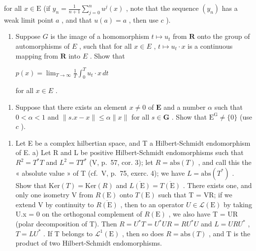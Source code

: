 for all \(x \in \mathrm{E}\) (if \(y_{n} = \frac{1}{n + 1} \sum_{j=0}^{n} u^{j}(x)\) , note that the sequence \((y_{n})\) has a weak limit point \(a\) , and that \(u(a) = a\) , then use \(c\) ).

\begin{enumerate}
\def\labelenumi{\alph{enumi})}
\setcounter{enumi}{4}
\tightlist
\item
  Suppose \(G\) is the image of a homomorphism \(t \mapsto u_t\) from \(\mathbf{R}\) onto the group of automorphisms of \(E\) , such that for all \(x \in E\) , \(t \mapsto u_t \cdot x\) is a continuous mapping from \(\mathbf{R}\) into \(E\) . Show that

\(p(x) = \lim_{T \to \infty} \frac{1}{T} \int_{0}^{T} u_t \cdot x \, dt\)

for all \(x \in E\) .

\end{enumerate}

\begin{enumerate}
\def\labelenumi{\alph{enumi})}
\setcounter{enumi}{5}
\tightlist
\item
  Suppose that there exists an element \(x \neq 0\) of \(\mathbf{E}\) and a number \(\alpha\) such that \(0 < \alpha < 1\) and \(\| s.x - x\| \leqslant \alpha \| x\|\) for all \(s \in \mathbf{G}\) . Show that \(\mathrm{E}^{\mathrm{G}} \neq \{0\}\) (use \(c\) ).
\end{enumerate}

\begin{enumerate}
\def\labelenumi{\arabic{enumi})}
\setcounter{enumi}{13}
\tightlist
\item
  Let E be a complex hilbertian space, and T a Hilbert-Schmidt endomorphism of E. a) Let R and L be positive Hilbert-Schmidt endomorphisms such that \(R^{2} = T^{*}T\) and \(L^{2} = TT^{*}\) (V, p.~57, cor. 3); let \(R = \text{abs}(T)\) , and call this the « absolute value » of T (cf.~V, p.~75, exerc. 4); we have \(L = \text{abs}(T^{*})\) . Show that \(\text{Ker}(T) = \text{Ker}(R)\) and \(\overline{L(\text{E})} = \overline{T(\text{E})}\) . There exists one, and only one isometry V from \(R(\text{E})\) onto \(T(\text{E})\) such that T = VR; if we extend V by continuity to \(\overline{R(\text{E})}\) , then to an operator \(U \in \mathcal{L}(\text{E})\) by taking U.x = 0 on the orthogonal complement of \(R(\text{E})\) , we also have T = UR (polar decomposition of T). Then \(R = U^{*}T = U^{*}UR = RU^{*}U\) and \(L = URU^{*}\) , \(T = LU^{*}\) . If T belongs to \(\mathcal{L}^{1}(\text{E})\) , then so does \(R = \text{abs}(T)\) , and T is the product of two Hilbert-Schmidt endomorphisms.
\end{enumerate}

